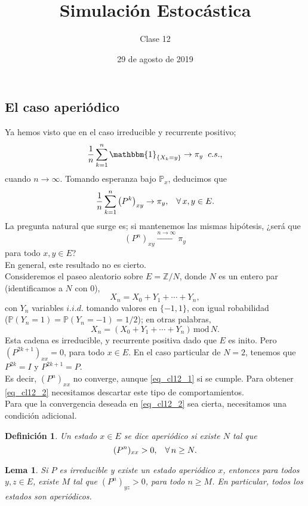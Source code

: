 \documentclass[a4paper]{article}
\title{Simulación Estocástica}
\author{Clase 12}
\date{29 de agosto de 2019}
\newcommand{\prob}{\mathbb{P}}
\newtheorem{definicion}{Definición}
\newtheorem{lem}{Lema}
\numberwithin{equation}{subsection}
\numberwithin{definicion}{subsection}
\def\Z{\mathbb Z}
\begin{document}
\maketitle

\subsection{El caso aperiódico}
Ya hemos visto que en el caso irreducible y recurrente positivo;
\[\frac{1}{n}\sum_{k=1}^n\mathbbm{1}_{\{X_k = y\}}\rightarrow \pi_y\hspace{0.2cm}c.s.,\]
cuando $n\rightarrow \infty$. Tomando esperanza bajo $\prob_x$, deducimos que
\begin{equation}
\frac{1}{n}\sum_{k=1}^n\left(P^k\right)_{xy}\rightarrow \pi_y,\hspace{0.3cm}\forall\,x,y\in E.
\label{eq_cl12_1}
\end{equation}
La pregunta natural que surge es; si mantenemos las mismas hipótesis, ¿será que
\begin{equation}
    (P^n)_{xy}\xrightarrow{n \rightarrow \infty}\pi_y
    \label{eq_cl12_2}
\end{equation}
para todo $x,y\in E$?\\ \newline
En general, este resultado no es cierto.\\ 

Consideremos el paseo aleatorio sobre $E = \Z/N$, donde $N$ es un entero par (identificamos a $N$ con 0),
\[X_n = X_0 + Y_1 + \cdots + Y_n,\]
con $Y_n$ variables $i.i.d.$ tomando valores en $\{-1,1\}$, con igual robabilidad \\($\prob(Y_n = 1) = \prob(Y_n=-1) = 1/2$); en otras palabras,
\[X_n = (X_0 + Y_1 + \cdots + Y_n)\,\text{mod}\,N.\]
Esta cadena es irreducible, y recurrente positiva dado que $E$ es inito. Pero $(P^{2k+1})_{xx}=0$, para todo $x\in E$. En el caso particular de $N=2$, tenemos que $P^{2k} = I$ y $P^{2k+1} = P$.\\ Es decir, $(P^n)_{xx}$ no converge, aunque \ref{eq_cl12_1} si se cumple. Para obtener \ref{eq_cl12_2} necesitamos descartar este tipo de comportamientos.\\ \newline
Para que la convergencia deseada en \ref{eq_cl12_2} sea cierta, necesitamos una condición adicional.
\begin{definicion}
Un estado $x\in E$ se dice aperiódico si existe $N$ tal que 
\[(P^n)_{xx}>0,\hspace{0.3cm}\forall\,n\geq N.\]
\end{definicion}
\begin{lem}
Si $P$ es irreducible y existe un estado aperiódico $x$, entonces para todos $y,z \in E$, existe $M$ tal que $(P^n)_{yz} >0$, para todo $n\geq M$. En particular, todos los estados son aperiódicos.
\end{lem}
\end{document}
